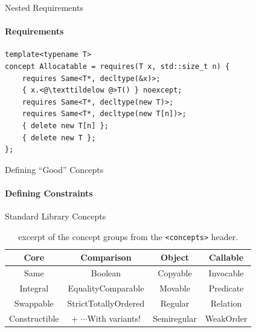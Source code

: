 \documentclass{beamer}
\begin{document}
    \begin{frame}[fragile]{Nested Requirements}
        \framesubtitle{Requirements}
        \begin{center}
        \begin{lstlisting}[caption={usage of nested requirement in an \texttt{Allocatable} concept.}]
template<typename T>
concept Allocatable = requires(T x, std::size_t n) {
    requires Same<T*, decltype(&x)>;
    { x.<@\texttildelow @>T() } noexcept;
    requires Same<T*, decltype(new T)>;
    requires Same<T*, decltype(new T[n])>;
    { delete new T[n] };
    { delete new T };
}; \end{lstlisting}
        \end{center}
    \end{frame}


    \begin{frame}[fragile]{Defining ``Good'' Concepts}
        \framesubtitle{Defining Constraints}
    \end{frame}

    \begin{frame}[fragile]{Standard Library Concepts}
        \begin{center}
        \begin{table}
        \begin{tabular}{cccc}
            \toprule
            \textbf{Core} & \textbf{Comparison} & \textbf{Object} & \textbf{Callable}\\
            \midrule
            Same & Boolean & Copyable & Invocable \\
            Integral & EqualityComparable & Movable & Predicate \\
            Swappable & StrictTotallyOrdered  & Regular & Relation \\
            Constructible & + $\cdots$With variants!   & Semiregular & WeakOrder \\
            \bottomrule
        \end{tabular}
        \caption{excerpt of the concept groups from the \texttt{<concepts>} header.}
        \end{table}
        \end{center}
    \end{frame}
\end{document}
